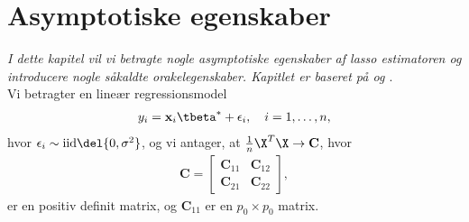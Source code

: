 \chapter{Asymptotiske egenskaber} \label{ch:asymptotics}
\textit{I dette kapitel vil vi betragte nogle asymptotiske egenskaber af lasso estimatoren og introducere nogle såkaldte orakelegenskaber.
Kapitlet er baseret på \cite{adaptive_lasso} og \cite{adaptive_lasso_knight}}. \\[4mm]
%


Vi betragter en lineær regressionsmodel 
\begin{align*}
y_i= \mathbf{x}_i \tbeta^* + \epsilon_i, \quad i = 1, \ldots, n,
\end{align*}
hvor \(\epsilon_i \sim \text{iid} \del{0, \sigma^2}\), og vi antager, at \(\frac{1}{n} \X^T \X \rightarrow \textbf{C}\), hvor
\begin{align*}
\textbf{C} = 
\begin{bmatrix}
\textbf{C}_{11}& \textbf{C}_{12}\\
\textbf{C}_{21}& \textbf{C}_{22}
\end{bmatrix},
\end{align*}
er en positiv definit matrix, og $\textbf{C}_{11}$ er en $p_0 \times p_0$ matrix. 

